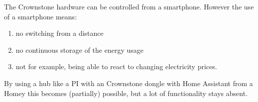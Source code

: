 The Crownstone hardware can be controlled from a smartphone. However the use of a smartphone means:
\begin{enumerate}
    \item no switching from a distance
    \item no continuous storage of the energy usage
    \item not for example, being able to react to changing electricity prices.
\end{enumerate}

By using a hub like a PI with an Crownstone dongle with Home Assistant from a Homey this becomes (partially) possible, but a lot of functionality stays absent.